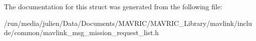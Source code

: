 The documentation for this struct was generated from the following file\+:\begin{DoxyCompactItemize}
\item 
/run/media/julien/\+Data/\+Documents/\+M\+A\+V\+R\+I\+C/\+M\+A\+V\+R\+I\+C\+\_\+\+Library/mavlink/include/common/mavlink\+\_\+msg\+\_\+mission\+\_\+request\+\_\+list.\+h\end{DoxyCompactItemize}
